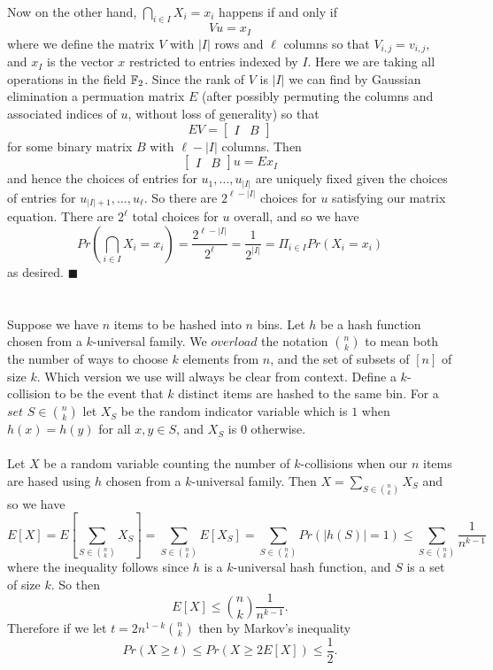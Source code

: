 \documentclass[letterpaper,12pt,oneside,onecolumn]{article}
\begin{document}
\paragraph{}
Now on the other hand, $\bigcap_{i \in I} X_i = x_i$ happens if and only if 
$$ Vu = x_I$$
where we define the matrix $V$ with $|I|$ rows and $\ell$ columns so that $V_{i,j} = v_{i,j}$, and $x_I$ is the vector $x$ restricted to entries indexed by $I$. Here we are taking all operations in the field $\mathbb{F}_2$. Since the rank of $V$ is $|I|$ we can find by Gaussian elimination a permuation matrix $E$ (after possibly permuting the columns and associated indices of $u$, without loss of generality) so that
$$EV = \begin{bmatrix}
I & B
\end{bmatrix}$$
for some binary matrix $B$ with $\ell - |I|$ columns. Then
$$\begin{bmatrix} I & B \end{bmatrix}u = Ex_I$$
and hence the choices of entries for $u_1, \dots, u_{|I|}$ are uniquely fixed given the choices of entries for $u_{|I| + 1}, \dots, u_{\ell}$. So there are $2^{\ell - |I|}$ choices for $u$ satisfying our matrix equation. There are $2^\ell$ total choices for $u$ overall, and so we have
$$Pr(\bigcap_{i \in I} X_i = x_i) = \frac{2^{\ell-|I|}}{2^\ell}  = \frac{1}{2^{|I|}} = \Pi_{i \in I} Pr(X_i = x_i)$$
as desired. $\blacksquare$
\newpage
\section{}
\paragraph{}
Suppose we have $n$ items to be hashed into $n$ bins. Let $h$ be a hash function chosen from a $k$-universal family. We $\textit{overload}$ the notation ${n \choose k}$ to mean both the number of ways to choose $k$ elements from $n$, and the set of subsets of $[n]$ of size $k$. Which version we use will always be clear from context. Define a $k$-collision to be the event that $k$ distinct items are hashed to the same bin. For a $\textit{set}$ $S \in {n\choose k}$ let $X_S$ be the random indicator variable which is $1$ when $h(x) = h(y)$ for all $x,y \in S$, and $X_S$ is $0$ otherwise.
\paragraph{}
Let $X$ be a random variable counting the number of $k$-collisions when our $n$ items are hased using $h$ chosen from a $k$-universal family. Then $X = \sum_{S \in {n\choose k}} X_S$ and so we have
$$E[X] = E[\sum_{S \in {n\choose k}} X_S] = \sum_{S \in {n\choose k}} E[X_S] = \sum_{S \in {n \choose k}} Pr(|h(S)| = 1) \leq  \sum_{S \in {n \choose k}} \frac{1}{n^{k-1}}$$
where the inequality follows since $h$ is a $k$-universal hash function, and $S$ is a set of size $k$. So then
$$E[X] \leq {n\choose k} \frac{1}{n^{k-1}}.$$
Therefore if we let $t = 2n^{1-k}{n\choose k}$ then by Markov's inequality
$$Pr(X \geq t) \leq Pr(X \geq 2E[X]) \leq \frac{1}{2}.$$
\end{document}
